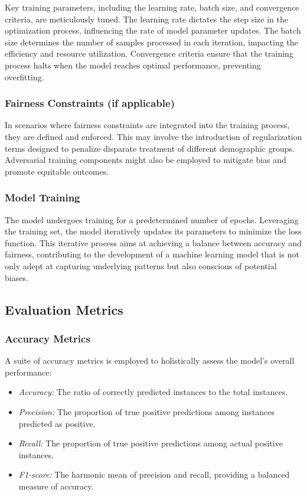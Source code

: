 Key training parameters, including the learning rate, batch size, and convergence criteria, are meticulously tuned. The learning rate dictates the step size in the optimization process, influencing the rate of model parameter updates. The batch size determines the number of samples processed in each iteration, impacting the efficiency and resource utilization. Convergence criteria ensure that the training process halts when the model reaches optimal performance, preventing overfitting.

\subsubsection{Fairness Constraints (if applicable)}

In scenarios where fairness constraints are integrated into the training process, they are defined and enforced. This may involve the introduction of regularization terms designed to penalize disparate treatment of different demographic groups. Adversarial training components might also be employed to mitigate bias and promote equitable outcomes.

\subsubsection{Model Training}

The model undergoes training for a predetermined number of epochs. Leveraging the training set, the model iteratively updates its parameters to minimize the loss function. This iterative process aims at achieving a balance between accuracy and fairness, contributing to the development of a machine learning model that is not only adept at capturing underlying patterns but also conscious of potential biases.

\subsection{Evaluation Metrics}

\subsubsection{Accuracy Metrics}

A suite of accuracy metrics is employed to holistically assess the model's overall performance:

\begin{itemize}
    \item \emph{Accuracy:} The ratio of correctly predicted instances to the total instances.
    
    \item \emph{Precision:} The proportion of true positive predictions among instances predicted as positive.
    
    \item \emph{Recall:} The proportion of true positive predictions among actual positive instances.
    
    \item \emph{F1-score:} The harmonic mean of precision and recall, providing a balanced measure of accuracy.
\end{itemize}

